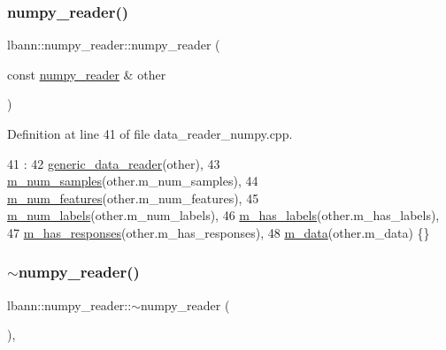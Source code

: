 \subsubsection{\texorpdfstring{numpy\+\_\+reader()}{numpy\_reader()}\hspace{0.1cm}{\footnotesize\ttfamily [2/2]}}
{\footnotesize\ttfamily lbann\+::numpy\+\_\+reader\+::numpy\+\_\+reader (\begin{DoxyParamCaption}\item[{const \hyperlink{classlbann_1_1numpy__reader}{numpy\+\_\+reader} \&}]{other }\end{DoxyParamCaption})}



Definition at line 41 of file data\+\_\+reader\+\_\+numpy.\+cpp.


\begin{DoxyCode}
41                                                     :
42   \hyperlink{classlbann_1_1generic__data__reader_aaba933b8f7c1227801f6e80d39986af4}{generic\_data\_reader}(other),
43   \hyperlink{classlbann_1_1numpy__reader_a5e0d81c07c950a2d81645566a2ccd965}{m\_num\_samples}(other.m\_num\_samples),
44   \hyperlink{classlbann_1_1numpy__reader_aef25f95077f565fa9616ec353b93f675}{m\_num\_features}(other.m\_num\_features),
45   \hyperlink{classlbann_1_1numpy__reader_ab311c3567e1ecc1770a4bc299ab0a3e2}{m\_num\_labels}(other.m\_num\_labels),
46   \hyperlink{classlbann_1_1numpy__reader_a0e8caa5609e706bf909b78c4c35377b8}{m\_has\_labels}(other.m\_has\_labels),
47   \hyperlink{classlbann_1_1numpy__reader_a7567338be86dff81afece19d031a942d}{m\_has\_responses}(other.m\_has\_responses),
48   \hyperlink{classlbann_1_1numpy__reader_a6d43a1eae0fedb6fa237b24cef8f37fa}{m\_data}(other.m\_data) \{\}
\end{DoxyCode}
\mbox{\label{classlbann_1_1numpy__reader_a9837face3a5bf4abe1e47c032b1210de}} 
\subsubsection{\texorpdfstring{$\sim$numpy\+\_\+reader()}{~numpy\_reader()}}
{\footnotesize\ttfamily lbann\+::numpy\+\_\+reader\+::$\sim$numpy\+\_\+reader (\begin{DoxyParamCaption}{ }\end{DoxyParamCaption})\hspace{0.3cm}{\ttfamily [inline]}, {\ttfamily [override]}}



